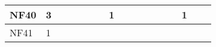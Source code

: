 \begin{table}[]
{\begin{tabular}{|l|l|l|l|l|l|l|l|l|l|l|l|l|l|l|l|l|}
NF40          & 3                                                     &                                                       &    &                                                       &    &                                                       & 1                                                     &    &    &                                                       &    &                                                  &                                                  & 1  &    &    \\ \hline
NF41          & 1                                                     &                                                       &    &                                                       &    &                                                       &                                                       &    &    &                                                       &    &                                                  &                                                  &    &    &    \\ \hline
\end{tabular}
}\end{table}

